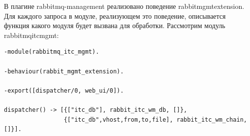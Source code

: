{В плагине rabbitmq-management реализовано поведение rabbit\underline{\hspace{0.25cm}}mgmt\underline{\hspace{0.25cm}}extension. Для каждого запроса в модуле, реализующем это поведение, описывается функция какого модуля будет вызвана для обработки. Рассмотрим модуль rabbitmq\underline{\hspace{0.25cm}}itc\underline{\hspace{0.25cm}}mgmt: 
\begin{lstlisting}
-module(rabbitmq_itc_mgmt).

-behaviour(rabbit_mgmt_extension).

-export([dispatcher/0, web_ui/0]).

dispatcher() -> [{["itc_db"], rabbit_itc_wm_db, []},
                 {["itc_db",vhost,from,to,file], rabbit_itc_wm_chain, []}].


\end{lstlisting}}
